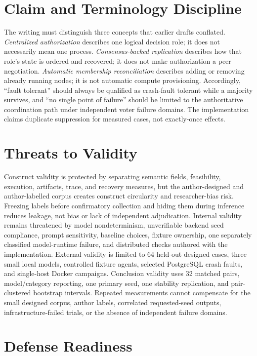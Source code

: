 \section{Claim and Terminology Discipline}

The writing must distinguish three concepts that earlier drafts conflated. \emph{Centralized authorization} describes one logical decision role; it does not necessarily mean one process. \emph{Consensus-backed replication} describes how that role's state is ordered and recovered; it does not make authorization a peer negotiation. \emph{Automatic membership reconciliation} describes adding or removing already running nodes; it is not automatic compute provisioning. Accordingly, ``fault tolerant'' should always be qualified as crash-fault tolerant while a majority survives, and ``no single point of failure'' should be limited to the authoritative coordination path under independent voter failure domains. The implementation claims duplicate suppression for measured cases, not exactly-once effects.

\section{Threats to Validity}

Construct validity is protected by separating semantic fields, feasibility, execution, artifacts, trace, and recovery measures, but the author-designed and author-labelled corpus creates construct circularity and researcher-bias risk. Freezing labels before confirmatory collection and hiding them during inference reduces leakage, not bias or lack of independent adjudication. Internal validity remains threatened by model nondeterminism, unverifiable backend seed compliance, prompt sensitivity, baseline choices, fixture ownership, one separately classified model-runtime failure, and distributed checks authored with the implementation. External validity is limited to 64 held-out designed cases, three small local models, controlled fixture agents, selected PostgreSQL crash faults, and single-host Docker campaigns. Conclusion validity uses 32 matched pairs, model/category reporting, one primary seed, one stability replication, and pair-clustered bootstrap intervals. Repeated measurements cannot compensate for the small designed corpus, author labels, correlated requested-seed outputs, infrastructure-failed trials, or the absence of independent failure domains.

\section{Defense Readiness}

